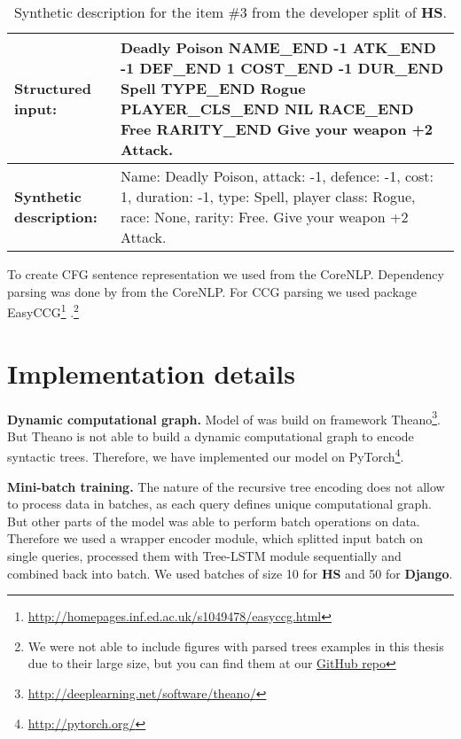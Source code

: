 \begin{table}
\begin{tabularx}{\textwidth}{ l X }
\hline
\textbf{Structured input:} & Deadly Poison NAME\_END -1 ATK\_END -1 DEF\_END 1 COST\_END -1 DUR\_END Spell TYPE\_END Rogue PLAYER\_CLS\_END NIL RACE\_END Free RARITY\_END Give your weapon +2 Attack. \\
\hline 
\textbf{Synthetic description:} & Name: Deadly Poison, attack: -1, defence: -1, cost: 1, duration: -1, type: Spell, player class: Rogue, race: None, rarity: Free. Give your weapon +2 Attack. \\
\hline
\end{tabularx}
\caption[Synthetic description example]{Synthetic description for the item \#3 from the developer split of \textbf{HS}.}
\label{table:hs_input}
\end{table}

To create CFG sentence representation we used  \parencite{klein2003} from the CoreNLP. Dependency parsing was done by  \parencite{chen2014} from the CoreNLP. For CCG parsing we used package EasyCCG\footnote{\href{http://homepages.inf.ed.ac.uk/s1049478/easyccg.html}{http://homepages.inf.ed.ac.uk/s1049478/easyccg.html}} \parencite{lewis2014}.\footnote{We were not able to include figures with parsed trees examples in this thesis due to their large size, but you can find them at our \href{https://github.com/tsdaemon/treelstm-code-generation/tree/master/pictures}{GitHub repo}}

\section{Implementation details}

\textbf{Dynamic computational graph.} Model of \cite{Yin2017} was build on framework Theano\footnote{\href{http://deeplearning.net/software/theano/}{http://deeplearning.net/software/theano/}}. But Theano is not able to build a dynamic computational graph to encode syntactic trees. Therefore, we have implemented our model on PyTorch\footnote{\href{http://pytorch.org/}{http://pytorch.org/}}.


\textbf{Mini-batch training.} The nature of the recursive tree encoding does not allow to process data in batches, as each query defines unique computational graph. But other parts of the model was able to perform batch operations on data. Therefore we used a wrapper encoder module, which splitted input batch on single queries, processed them with Tree-LSTM module sequentially and combined back into batch. We used batches of size 10 for \textbf{HS} and 50 for \textbf{Django}.

